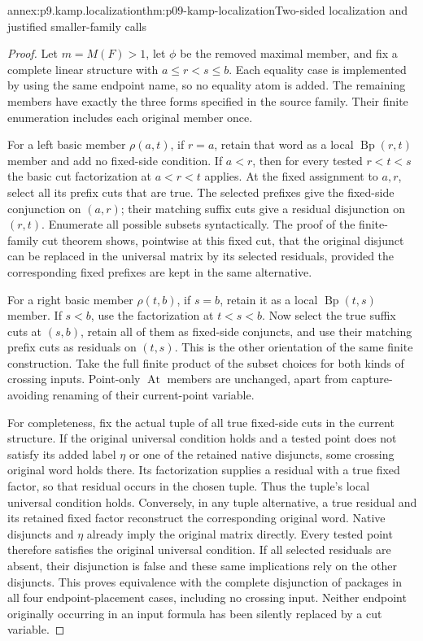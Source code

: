 \begin{annexitem}{annex:p9.kamp.localization}{thm:p09-kamp-localization}{Two-sided localization and justified smaller-family calls}
\begin{proof}
Let \(m=M(F)>1\), let \(\phi\) be the removed maximal
member, and fix a complete linear structure with
\(a\leq r<s\leq b\). Each equality case is implemented
by using the same endpoint name, so no equality atom is added.
The remaining members have exactly the three forms specified in
the source family. Their finite enumeration includes each original
member once.

For a left basic member \(\rho(a,t)\), if \(r=a\),
retain that word as a local \(\operatorname{Bp}(r,t)\)
member and add no fixed-side condition. If \(a<r\),
then for every tested \(r<t<s\) the basic cut factorization
at \(a<r<t\) applies. At the fixed assignment to \(a,r\),
select all its prefix cuts that are true. The selected prefixes
give the fixed-side conjunction on \((a,r)\); their matching
suffix cuts give a residual disjunction on \((r,t)\).
Enumerate all possible subsets syntactically. The proof of the
finite-family cut theorem shows, pointwise at this fixed cut,
that the original disjunct can be replaced in the universal matrix
by its selected residuals, provided the corresponding fixed
prefixes are kept in the same alternative.

For a right basic member \(\rho(t,b)\), if \(s=b\),
retain it as a local \(\operatorname{Bp}(t,s)\) member.
If \(s<b\), use the factorization at \(t<s<b\).
Now select the true suffix cuts at \((s,b)\), retain all
of them as fixed-side conjuncts, and use their matching prefix
cuts as residuals on \((t,s)\). This is the other orientation
of the same finite construction. Take the full finite product
of the subset choices for both kinds of crossing inputs.
Point-only \(\operatorname{At}\) members are unchanged,
apart from capture-avoiding renaming of their current-point variable.

For completeness, fix the actual tuple of all true fixed-side cuts
in the current structure. If the original universal condition holds
and a tested point does not satisfy its added label \(\eta\)
or one of the retained native disjuncts, some crossing original
word holds there. Its factorization supplies a residual with a
true fixed factor, so that residual occurs in the chosen tuple.
Thus the tuple's local universal condition holds. Conversely, in
any tuple alternative, a true residual and its retained fixed
factor reconstruct the corresponding original word. Native disjuncts
and \(\eta\) already imply the original matrix directly.
Every tested point therefore satisfies the original universal
condition. If all selected residuals are absent, their disjunction
is false and these same implications rely on the other disjuncts.
This proves equivalence with the complete disjunction of packages
in all four endpoint-placement cases, including no crossing input.
Neither endpoint originally occurring in an input formula has
been silently replaced by a cut variable.


\end{proof}
\end{annexitem}
